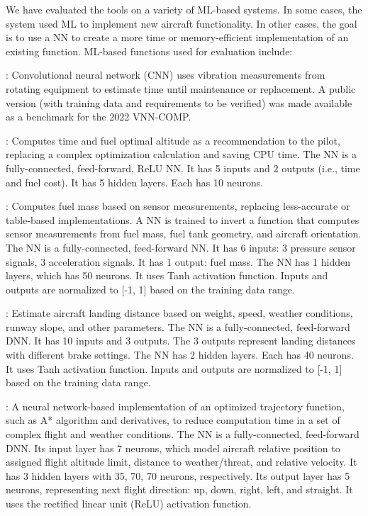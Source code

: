 We have evaluated the tools on a variety of ML-based systems.  In some cases, the system used ML to implement new aircraft functionality.  In other cases, the goal is to use a NN to create a more time or memory-efficient implementation of an existing function.  ML-based functions used for evaluation include:

 \cite{rul}:  Convolutional neural network (CNN) uses vibration measurements from rotating equipment to estimate time until maintenance or replacement.  A public version (with training data and requirements to be verified) was made available as a benchmark for the 2022 VNN-COMP.


:  Computes time and fuel optimal altitude as a recommendation to the pilot, replacing a complex optimization calculation and saving CPU time. The NN is a fully-connected, feed-forward, ReLU NN. It has 5 inputs and 2 outputs (i.e., time and fuel cost). It has 5 hidden layers. Each has 10 neurons.


:  Computes fuel mass based on sensor measurements, replacing less-accurate or table-based implementations.  A NN is trained to invert a function that computes sensor measurements from fuel mass, fuel tank geometry, and aircraft orientation.  The NN is a fully-connected, feed-forward NN. It has 6 inputs: 3 pressure sensor signals, 3 acceleration signals. It has 1 output: fuel mass. The NN has 1 hidden layers, which has 50 neurons. It uses Tanh activation function. Inputs and outputs are normalized to [-1, 1] based on the training data range.


:  Estimate aircraft landing distance based on weight, speed, weather conditions, runway slope, and other parameters.  The NN is a fully-connected, feed-forward DNN. It has 10 inputs and 3 outputs. The 3 outputs represent landing distances with different brake settings. The NN has 2 hidden layers. Each has 40 neurons. It uses Tanh activation function. Inputs and outputs are normalized to [-1, 1] based on the training data range.


: A neural network-based implementation of an optimized trajectory function, such as A* algorithm and derivatives, to reduce computation time in a set of complex flight and weather conditions. The NN is a fully-connected, feed-forward DNN. Its input layer has 7 neurons, which model aircraft relative position to assigned flight altitude limit, distance to weather/threat, and relative velocity. It has 3 hidden layers with 35, 70, 70 neurons, respectively. Its output layer has 5 neurons, representing next flight direction: up, down, right, left, and straight. It uses the rectified linear unit (ReLU) activation function. 


